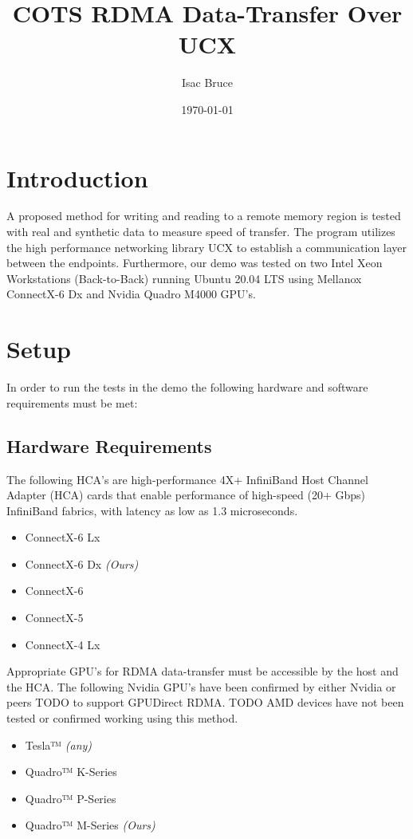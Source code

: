 \documentclass[a4paper,onecolumn]{article}
\begin{document}
\title{COTS RDMA Data-Transfer Over UCX}


\author{Isac Bruce}

\date{\today}


\maketitle



\section{Introduction}
A proposed method for writing and reading to a remote memory region is tested with real and synthetic data to measure speed of transfer. The program utilizes the high performance networking library UCX to establish a communication layer between the endpoints. Furthermore, our demo was tested on two Intel Xeon Workstations (Back-to-Back) running Ubuntu 20.04 LTS  using Mellanox ConnectX-6 Dx and Nvidia Quadro M4000 GPU's.

\section{Setup}
In order to run the tests in the demo the following hardware and software requirements must be met:
\subsection{Hardware Requirements}
The following HCA's are high-performance 4X+ InfiniBand Host Channel Adapter
(HCA) cards that enable performance of high-speed (20+ Gbps) InfiniBand fabrics, with latency as low as 1.3 microseconds. 
\begin{itemize}
   \item ConnectX-6 Lx
   \item ConnectX-6 Dx  \textit{(Ours)}
   \item ConnectX-6
   \item ConnectX-5
   \item ConnectX-4 Lx
 \end{itemize}


Appropriate GPU's for RDMA data-transfer must be accessible by the host and the HCA. The following Nvidia GPU's have been confirmed by either Nvidia or peers TODO to support GPUDirect RDMA. TODO
AMD devices have not been tested or confirmed working using this method.

\begin{itemize}
   \item Tesla™ \textit{(any)}
   \item Quadro™ K-Series
   \item Quadro™ P-Series
   \item Quadro™ M-Series \textit{(Ours)}
 \end{itemize}
\end{document}
